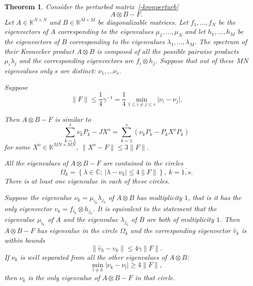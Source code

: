 \documentclass[a4paper]{article}
\newtheorem{thm}{Theorem}
\theoremstyle{definition}
\begin{document}
\begin{thm}
    Consider the perturbed matrix~\eqref{-kronperturb}
        \[
            A{\otimes}B - F.
        \]
    Let \( A\in\mathbb{K}^{N{\times}N} \) and \( B\in\mathbb{K}^{M{\times}M} \)
        be diagonalizable matrices.
    Let \( f_1, \ldots, f_N \) be the eigenvectors of \( A \)
        corresponding to the eigenvalues \( \mu_1, \ldots, \mu_N \)
        and let \( h_1, \ldots, h_M \) be the eigenvectors of \( B \)
        corresponding to the eigenvalues \( \lambda_1, \ldots, \lambda_M \).
    The spectrum of their Kronecker product \( A{\otimes}B \)
        is composed of all the possible pairwise products \( \mu_i \lambda_j \)
        and the corresponding eigenvectors are \( f_i\otimes h_j \).
    Suppose that out of these \( MN \) eigenvalues only \( s \) are distinct:
        \( \nu_1, \ldots \nu_s \).

    Suppose
    \[
        \|F\| \leq \frac14 \gamma^{-1} = \frac14 \min_{1\leq i{\neq}j\leq s}\lvert\nu_i - \nu_j\rvert.
    \]

    Then \( A{\otimes}B - F \) is similar to
    \[ \sum_{k=1}^s \nu_k P_k - JX^o = \sum_{k=1}^s (\nu_k P_k - P_k X^o P_k) \]
    for some \( X^o \in \mathbb{K}^{MN{\times}MN} \),
    \( \|X^o - F\|\leq 3\|F\| \).

    All the eigenvalues of \( A{\otimes}B - F \) are contained in the circles
    \[
        \Omega_k = \left\{
            \lambda\in\mathbb{C};
            \ \lvert\lambda - \nu_k\rvert \leq 4\|F\|
            \right\},
        \ k{=}\overline{1,s}.
    \]
    There is at least one eigenvalue in each of these circles.

    Suppose the eigenvalue \( \nu_k=\mu_{i_k}\lambda_{j_k} \) of \( A{\otimes}B \) has multiplicity \( 1 \),
        that is it has the only eigenvector \( v_k = f_{i_k}{\otimes}h_{j_k} \).
    It is equivalent to the statement that the eigenvalue \( \mu_{i_k} \)
        of \( A \) and the eigenvalue \( \lambda_{j_k} \) of \( B \)
        are both of multiplicity \( 1 \).
    Then \( A{\otimes}B - F \) has eigenvalue in the circle \( \Omega_k \)
        and the corresponding eigenvector \( \hat{v}_k \) is within bounds
    \[
        \|\hat{v}_k - v_k\| \leq 4\gamma \|F\|.
    \]
    If \( \nu_k \) is well separated from all the other eigenvalues of \( A{\otimes}B \):
    \[
        \min_{l\neq k}
        \lvert
        \nu_k - \nu_l
        \rvert
        \geq 4\|F\|,
    \]
    then \( \nu_k \) is the only eigenvalue of \( A{\otimes}B - F \)
    in that circle.
\end{thm}
\end{document}
